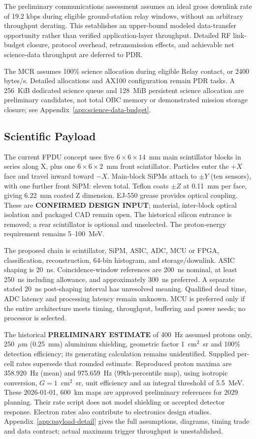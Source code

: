 The preliminary communications assessment assumes an ideal gross downlink rate of 19.2 kbps during eligible ground-station relay windows, without an arbitrary throughput derating. This establishes an upper-bound modeled data-transfer opportunity rather than verified application-layer throughput. Detailed RF link-budget closure, protocol overhead, retransmission effects, and achievable net science-data throughput are deferred to PDR.

The MCR assumes 100\% science allocation during eligible Relay contact, or 2400 bytes/s. Detailed allocations and AX100 configuration remain PDR tasks. A 256~KiB dedicated science queue and 128~MiB persistent science allocation are preliminary candidates, not total OBC memory or demonstrated mission storage closure; see Appendix~\ref{app:science-data-budget}.

\subsection{Scientific Payload}\label{payload-subsystem}
The current FPDU concept uses five $6\times6\times14$~mm main scintillator blocks in series along X, plus one $6\times6\times2$~mm front scintillator. Particles enter the $+X$ face and travel inward toward $-X$. Main-block SiPMs attach to $\pm Y$ (ten sensors), with one further front SiPM: eleven total. Teflon coats $\pm Z$ at 0.11~mm per face, giving 6.22~mm coated Z dimension. EJ-550 grease provides optical coupling. These are \textbf{CONFIRMED DESIGN INPUT}; material, inter-block optical isolation and packaged CAD remain open. The historical silicon entrance is removed; a rear scintillator is optional and unselected. The proton-energy requirement remains 5--100~MeV.

The proposed chain is scintillator, SiPM, ASIC, ADC, MCU or FPGA, classification, reconstruction, 64-bin histogram, and storage/downlink. ASIC shaping is 20~ns. Coincidence-window references are 200~ns nominal, at least 250~ns including allowance, and approximately 300~ns preferred. A separate stated 20~ns post-shaping interval has unresolved meaning. Qualified dead time, ADC latency and processing latency remain unknown. MCU is preferred only if the entire architecture meets timing, throughput, buffering and power needs; no processor is selected.

The historical \textbf{PRELIMINARY ESTIMATE} of 400~Hz assumed protons only, 250~$\mu$m (0.25~mm) aluminium shielding, geometric factor 1~cm$^2$~sr and 100\% detection efficiency; its generating calculation remains unidentified. Supplied per-cell rates supersede that rounded estimate. Reproduced proton maxima are 358.920~Hz (mean) and 975.659~Hz (99th-percentile map), using isotropic conversion, $G=1$~cm$^2$~sr, unit efficiency and an integral threshold of 5.5~MeV. These 2026-01-01, 600~km maps are approved preliminary references for 2029 planning. Their rate script does not model shielding or accepted detector response. Electron rates also contribute to electronics design studies. Appendix~\ref{app:payload-detail} gives the full assumptions, diagrams, timing trade and data contract; actual maximum trigger throughput is unestablished.

